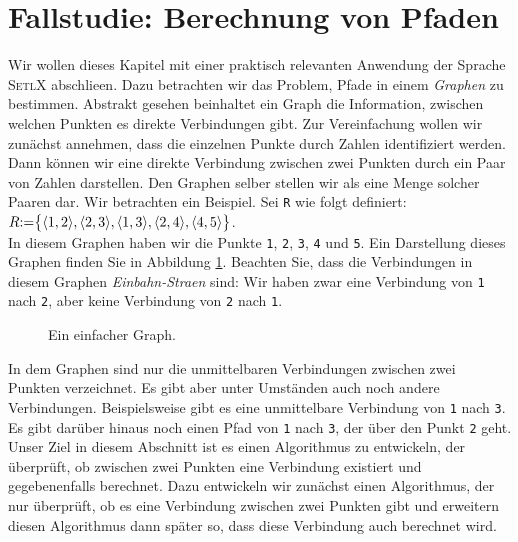 \section{Fallstudie: Berechnung von Pfaden}
Wir wollen  dieses Kapitel mit einer praktisch relevanten Anwendung der Sprache
\textsc{SetlX} abschlie\3en.  Dazu betrachten wir das Problem, Pfade in
einem \emph{Graphen} zu bestimmen.  Abstrakt gesehen beinhaltet ein Graph die Information,
zwischen welchen Punkten es direkte Verbindungen gibt.
Zur Vereinfachung wollen wir zun\"{a}chst annehmen, dass die einzelnen Punkte durch Zahlen
identifiziert werden.  Dann k\"{o}nnen wir eine direkte Verbindung zwischen zwei Punkten durch
ein Paar von Zahlen
darstellen.  Den Graphen selber stellen wir als eine Menge solcher Paaren dar.
Wir betrachten ein Beispiel. Sei \texttt{R} wie folgt definiert: \\[0.2cm]
\hspace*{0.5cm} 
$R \mathtt{:=} \bigl\{ \pair(1,2), \pair(2,3), \pair(1,3), \pair(2,4), \pair(4,5) \bigr\}$.
\\[0.2cm]
In diesem Graphen haben wir die Punkte \texttt{1},
\texttt{2}, \texttt{3}, \texttt{4} und \texttt{5}.  Ein Darstellung dieses Graphen finden
Sie in Abbildung \ref{fig:graph0}.
Beachten Sie, dass die Verbindungen in diesem Graphen
\emph{Einbahn-Stra\3en} sind:  Wir haben zwar eine Verbindung von \texttt{1} nach
\texttt{2}, aber keine Verbindung von \texttt{2} nach \texttt{1}.
 
\begin{figure}[!ht]
  \centering

  \caption{Ein einfacher Graph.}
  \label{fig:graph0}
\end{figure}



\noindent
In dem Graphen sind nur die unmittelbaren Verbindungen
zwischen zwei Punkten verzeichnet.  Es gibt aber unter Umst\"{a}nden auch noch
andere Verbindungen.  Beispielsweise gibt es eine unmittelbare Verbindung von
\texttt{1} nach \texttt{3}.  Es gibt dar\"{u}ber hinaus noch einen
Pfad von \texttt{1} nach \texttt{3}, der \"{u}ber den Punkt \texttt{2} geht.  
Unser Ziel in diesem Abschnitt ist es einen Algorithmus zu entwickeln, der \"{u}berpr\"{u}ft, ob
zwischen zwei Punkten eine Verbindung existiert und gegebenenfalls berechnet.
Dazu entwickeln wir zun\"{a}chst einen Algorithmus, der nur \"{u}berpr\"{u}ft, ob es eine
Verbindung zwischen zwei Punkten gibt und erweitern diesen Algorithmus dann sp\"{a}ter so, dass diese
Verbindung auch berechnet wird.

